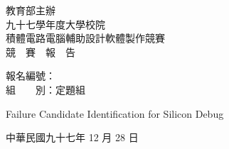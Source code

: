 \begin{titlepage}

\begin{center}

\begin{Large}
教育部主辦\\[1cm]
九十七學年度大學校院\\[1cm]
積體電路電腦輔助設計軟體製作競賽\\[1cm]
競　賽　報　告
\end{Large}

\vfill

\begin{large}
報名編號：　　　\\
組　　別：定題組
\end{large}

\vfill

\begin{Large}
Failure Candidate Identification for Silicon Debug
\end{Large}

\vfill

\begin{large}
中華民國九十七年 12 月 28 日
\end{large}

\end{center}

\end{titlepage}

